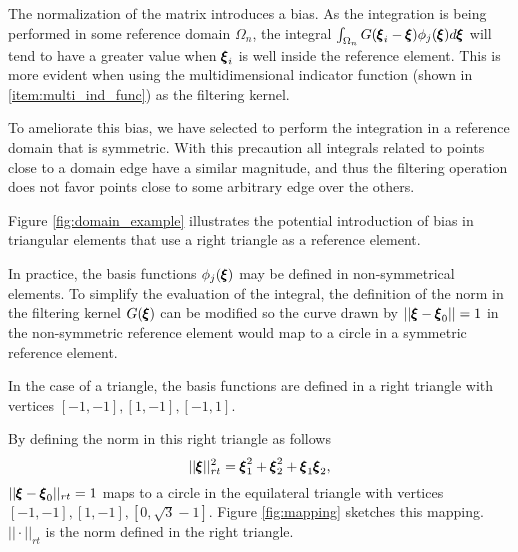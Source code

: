 The normalization of the matrix introduces a bias. As the integration is being performed in some reference domain $\Omega_n$, the integral $\int_{\Omega_n} G({\pmb \xi}_i - {\pmb \xi})  \phi_j({\pmb \xi})d{\pmb \xi}$ will tend to have a greater value when ${\pmb \xi}_i$ is well inside the reference element. This is more evident when using the multidimensional indicator function (shown in \ref{item:multi_ind_func}) as the filtering kernel.

To ameliorate this bias, we have selected to perform the integration in a reference domain that is symmetric. With this precaution all integrals related to points close to a domain edge have a similar magnitude, and thus the filtering operation does not favor points close to some arbitrary edge over the others.

Figure \ref{fig:domain_example} illustrates the potential introduction of bias in triangular elements that use a right triangle as a reference element.

\begin{figure*}

    \hfill
\caption{Using the same filter width in two different domains introduces different bias. The small, solid circles represent the location of solution points. The large circles represent the filter width acting on two specific internal points in two different domains. Integration is being performed in the area encompassed by the solid, straight lines.}
\label{fig:domain_example}

\end{figure*}

In practice, the basis functions $\phi_j({\pmb \xi})$ may be defined in non-symmetrical elements. To simplify the evaluation of the integral, the definition of the norm in the filtering kernel $G({\pmb \xi})$ can be modified so the curve drawn by $||{\pmb \xi} -{\pmb \xi}_0|| = 1$ in the non-symmetric reference element would map to a circle in a symmetric reference element.

In the case of a triangle, the basis functions are defined in a right triangle with vertices $[-1,-1], [1,-1],[-1,1]$.

By defining the norm in this right triangle as follows
\begin{equation}
\label{eqn:rect_norm}
||{\pmb \xi}||^2_{rt} = {\pmb \xi}_1^2 + {\pmb \xi}_2^2 + {\pmb \xi}_1{\pmb \xi}_2,
\end{equation}
$||{\pmb \xi} -{\pmb \xi}_0||_{rt} = 1$ maps to a circle in the equilateral triangle with vertices $[-1,-1],[1,-1],[0,\sqrt{3}-1]$. Figure \ref{fig:mapping} sketches this mapping. $||\cdot||_{rt}$ is the norm defined in the right triangle.


